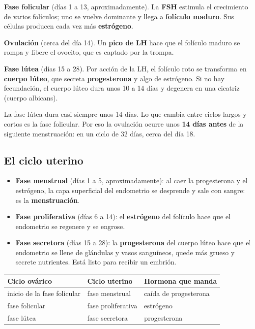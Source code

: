 \textbf{Fase folicular} (días 1 a 13, aproximadamente). La \textbf{FSH} estimula el crecimiento de varios folículos; uno se vuelve dominante y llega a \textbf{folículo maduro}. Sus células producen cada vez más \textbf{estrógeno}.

 

\textbf{Ovulación} (cerca del día 14). Un \textbf{pico de LH} hace que el folículo maduro se rompa y libere el ovocito, que es captado por la trompa.

  

\textbf{Fase lútea} (días 15 a 28). Por acción de la LH, el folículo roto se transforma en \textbf{cuerpo lúteo}, que secreta \textbf{progesterona} y algo de estrógeno. Si no hay fecundación, el cuerpo lúteo dura unos 10 a 14 días y degenera en una cicatriz (cuerpo albicans).

 
\begin{clave}[{Recuerda}] La fase lútea dura casi siempre unos 14 días. Lo que cambia entre ciclos largos y cortos es la fase folicular. Por eso la ovulación ocurre unos \textbf{14 días antes} de la siguiente menstruación: en un ciclo de 32 días, cerca del día 18.\end{clave}
\subsection{El ciclo uterino}
\begin{itemize}
  \item \textbf{Fase menstrual} (días 1 a 5, aproximadamente): al caer la progesterona y el estrógeno, la capa superficial del endometrio se desprende y sale con sangre: es la \textbf{menstruación}.
  \item \textbf{Fase proliferativa} (días 6 a 14): el \textbf{estrógeno} del folículo hace que el endometrio se regenere y se engrose.
  \item \textbf{Fase secretora} (días 15 a 28): la \textbf{progesterona} del cuerpo lúteo hace que el endometrio se llene de glándulas y vasos sanguíneos, quede más grueso y secrete nutrientes. Está listo para recibir un embrión.
\end{itemize}
 
\begin{center}\small
\begin{tabularx}{\linewidth}{@{}>{\raggedright\arraybackslash\hsize=1.23\hsize}X>{\raggedright\arraybackslash\hsize=0.82\hsize}X>{\raggedright\arraybackslash\hsize=0.95\hsize}X@{}}
\toprule
\textbf{Ciclo ovárico} & \textbf{Ciclo uterino} & \textbf{Hormona que manda} \\
\midrule
inicio de la fase folicular & fase menstrual & caída de progesterona \\
fase folicular & fase proliferativa & estrógeno \\
fase lútea & fase secretora & progesterona \\
\bottomrule
\end{tabularx}
\end{center}
  
